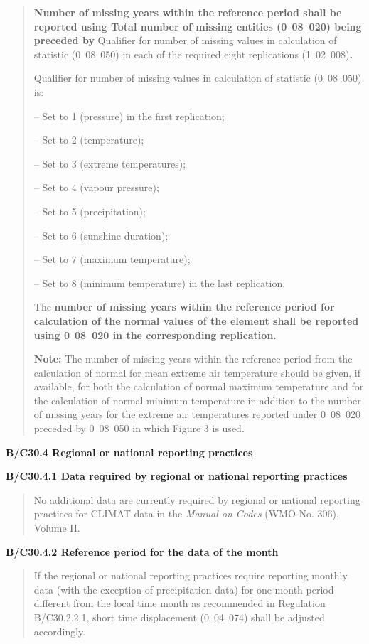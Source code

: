 \begin{quote}
\textbf{Number of missing years within the reference period shall be reported using Total number of missing entities (0}~\textbf{08~020) being preceded by} Qualifier for number of missing values in calculation of statistic (0~08~050) in each of the required eight replications (1~02~008)\textbf{.}

Qualifier for number of missing values in calculation of statistic (0~08~050) is:

-- Set to 1 (pressure) in the first replication;

-- Set to 2 (temperature);

-- Set to 3 (extreme temperatures);

-- Set to 4 (vapour pressure);

-- Set to 5 (precipitation);

-- Set to 6 (sunshine duration);

-- Set to 7 (maximum temperature);

-- Set to 8 (minimum temperature) in the last replication.

The \textbf{number of missing years within the reference period for calculation of the normal values of the element shall be reported using 0}~\textbf{08~020 in the corresponding replication.}

\textbf{Note:} The number of missing years within the reference period from the calculation of normal for mean extreme air temperature should be given, if available, for both the calculation of normal maximum temperature and for the calculation of normal minimum temperature in addition to the number of missing years for the extreme air temperatures reported under 0~08~020 preceded by 0~08~050 in which Figure 3 is used.
\end{quote}

\textbf{B/C30.4 Regional or national reporting practices}

\textbf{B/C30.4.1 Data required by regional or national reporting practices}

\begin{quote}
No additional data are currently required by regional or national reporting practices for CLIMAT data in the \emph{Manual on Codes} (WMO-No. 306), Volume II.
\end{quote}

\textbf{B/C30.4.2 Reference period for the data of the month}

\begin{quote}
If the regional or national reporting practices require reporting monthly data (with the exception of precipitation data) for one-month period different from the local time month as recommended in Regulation B/C30.2.2.1, short time displacement (0~04~074) shall be adjusted accordingly.
\end{quote}

